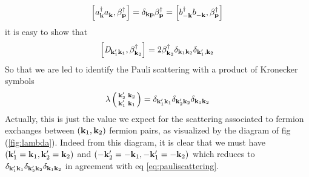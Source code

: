 \documentclass[aps,prb,amsmath,amssymb,preprint,superscriptaddress]{revtex4-1}
\begin{document}
\begin{equation}\label{eq:aBeta}
\left[a^{\dagger}_{\mathbf{k}}a^{}_{\mathbf{k}},\beta^{\dagger}_{\mathbf{p}}\right]=\delta_{\mathbf{k}\mathbf{p}}\beta^{\dagger}_{\mathbf{p}}=\left[b^{\dagger}_{-\mathbf{k}}b^{}_{-\mathbf{k}},\beta^{\dagger}_{\mathbf{p}}\right]
\end{equation}
it is easy to show that 
\begin{equation}\label{eq:Dcom}
\left[\mathit{D}_{\mathbf{k}'_1\mathbf{k}_1},\beta^{\dagger}_{\mathbf{k}_2}\right]=2\beta^{\dagger}_{\mathbf{k}_2}\delta_{\mathbf{k}_1\mathbf{k}_2}\delta_{\mathbf{k}'_1,\mathbf{k}_2}
\end{equation}
So that we are led to identify the Pauli scattering with a product of Kronecker symbols 
\begin{equation}\label{eq:pauliscattering}
\lambda\left(\begin{smallmatrix}\mathbf{k}'_2&\mathbf{k}_2\\\mathbf{k}'_1&\mathbf{k}_1\end{smallmatrix}\right)=\delta_{\mathbf{k}'_1\mathbf{k}_1}\delta_{\mathbf{k}'_2\mathbf{k}_2}\delta_{\mathbf{k}_1\mathbf{k}_2}
\end{equation}
Actually, this is just the value we expect for  the scattering associated to fermion exchanges between $\left(\mathbf{k}_1,\mathbf{k}_2\right)$ fermion pairs, as visualized by the diagram of fig (\ref{fig:lambda}). Indeed from this diagram, it is clear that we must have $\left(\mathbf{k}'_1=\mathbf{k}_1,\mathbf{k}'_2=\mathbf{k}_2\right)$ and $\left(-\mathbf{k}'_2=-\mathbf{k}_1,-\mathbf{k}'_1=-\mathbf{k}_2\right)$ which reduces to $\delta_{\mathbf{k}'_1\mathbf{k}_1}\delta_{\mathbf{k}'_2\mathbf{k}_2}\delta_{\mathbf{k}_1\mathbf{k}_2}$ in agreement with eq \eqref{eq:pauliscattering}.
 
\end{document}
